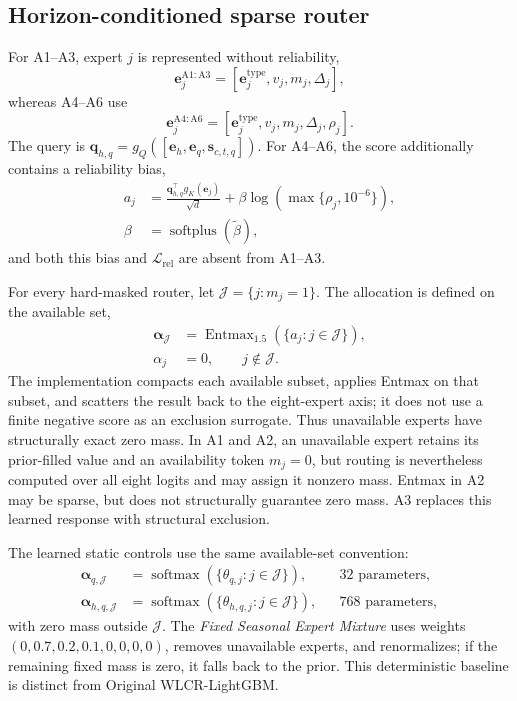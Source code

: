 \documentclass[10pt,conference,letterpaper]{IEEEtran}
\newcommand{\originalmethod}{Original WLCR-LightGBM}
\newcommand{\fixedmixture}{Fixed Seasonal Expert Mixture}
\begin{document}
\subsection{Horizon-conditioned sparse router}
For A1--A3, expert $j$ is represented without reliability,
\begin{equation}
\mathbf e^{\mathrm{A1:A3}}_j=[\mathbf e^{\mathrm{type}}_j,v_j,m_j,\Delta_j],
\end{equation}
whereas A4--A6 use
\begin{equation}
\mathbf e^{\mathrm{A4:A6}}_j=[\mathbf e^{\mathrm{type}}_j,v_j,m_j,\Delta_j,\rho_j].
\end{equation}
The query is $\mathbf q_{h,q}=g_Q([\mathbf e_h,\mathbf e_q,\mathbf s_{c,t,q}])$. For A4--A6, the score additionally contains a reliability bias,
\begin{equation}
\begin{aligned}
a_j&=\frac{\mathbf q_{h,q}^{\top}g_K(\mathbf e_j)}{\sqrt d}
+\beta\log\!\left(\max\{\rho_j,10^{-6}\}\right),\\
\beta&=\operatorname{softplus}(\widetilde\beta),
\end{aligned}
\end{equation}
and both this bias and $\mathcal L_{\mathrm{rel}}$ are absent from A1--A3.

For every hard-masked router, let $\mathcal J=\{j:m_j=1\}$. The allocation is defined on the available set,
\begin{align}
\boldsymbol\alpha_{\mathcal J}
 &=\operatorname{Entmax}_{1.5}(\{a_j:j\in\mathcal J\}),\\
\alpha_j&=0,\qquad j\notin\mathcal J .
\end{align}
The implementation compacts each available subset, applies Entmax on that subset, and scatters the result back to the eight-expert axis; it does not use a finite negative score as an exclusion surrogate. Thus unavailable experts have structurally exact zero mass. In A1 and A2, an unavailable expert retains its prior-filled value and an availability token $m_j=0$, but routing is nevertheless computed over all eight logits and may assign it nonzero mass. Entmax in A2 may be sparse, but does not structurally guarantee zero mass. A3 replaces this learned response with structural exclusion.

The learned static controls use the same available-set convention:
\begin{align}
\boldsymbol\alpha_{q,\mathcal J}&=\operatorname{softmax}(\{\theta_{q,j}:j\in\mathcal J\}), &&32\text{ parameters},\\
\boldsymbol\alpha_{h,q,\mathcal J}&=\operatorname{softmax}(\{\theta_{h,q,j}:j\in\mathcal J\}), &&768\text{ parameters},
\end{align}
with zero mass outside $\mathcal J$. The \emph{\fixedmixture{}} uses weights $(0,0.7,0.2,0.1,0,0,0,0)$, removes unavailable experts, and renormalizes; if the remaining fixed mass is zero, it falls back to the prior. This deterministic baseline is distinct from \originalmethod{}.
\end{document}
